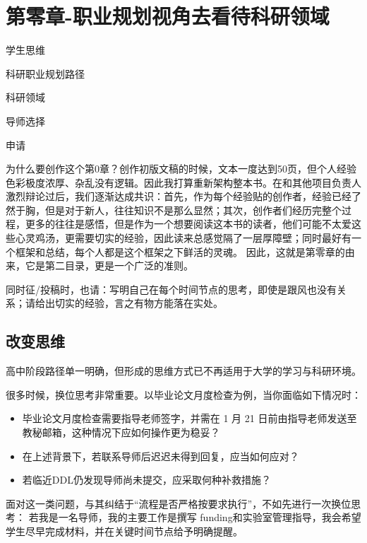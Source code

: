 \chapter{第零章-职业规划视角去看待科研领域}

\begin{introduction}
    \item 学生思维
    \item 科研职业规划路径
    \item 科研领域
    \item 导师选择
    \item 申请
\end{introduction}
\begin{notebox}
    为什么要创作这个第0章？创作初版文稿的时候，文本一度达到50页，但个人经验色彩极度浓厚、杂乱没有逻辑。因此我打算重新架构整本书。在和其他项目负责人激烈辩论过后，我们逐渐达成共识：首先，作为每个经验贴的创作者，经验已经了然于胸，但是对于新人，往往知识不是那么显然；其次，创作者们经历完整个过程，更多的往往是感悟，但是作为一个想要阅读这本书的读者，他们可能不太爱这些心灵鸡汤，更需要切实的经验，因此读来总感觉隔了一层厚障壁；同时最好有一个框架和总结，每个人都是这个框架之下鲜活的灵魂。
    因此，这就是第零章的由来，它是第二目录，更是一个广泛的准则。

    同时征/投稿时，也请：写明自己在每个时间节点的思考，即使是跟风也没有关系；请给出切实的经验，言之有物方能落在实处。
\end{notebox}


\section{改变思维}
高中阶段路径单一明确，但形成的思维方式已不再适用于大学的学习与科研环境。

很多时候，换位思考非常重要。以毕业论文月度检查为例，当你面临如下情况时：
\begin{itemize}
\item 毕业论文月度检查需要指导老师签字，并需在 1 月 21 日前由指导老师发送至教秘邮箱，这种情况下应如何操作更为稳妥？
\item 在上述背景下，若联系导师后迟迟未得到回复，应当如何应对？
\item 若临近DDL仍发现导师尚未提交，应采取何种补救措施？
\end{itemize}

面对这一类问题，与其纠结于“流程是否严格按要求执行”，不如先进行一次换位思考：
若我是一名导师，我的主要工作是撰写 funding和实验室管理指导，我会希望学生尽早完成材料，并在关键时间节点给予明确提醒。

